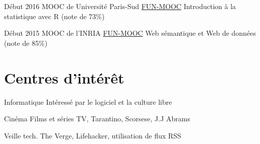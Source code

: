 \documentclass[letterpaper]{twentysecondcv} %
\begin{document}
\begin{twenty}
    
    \twentyitem
    	{Début 2016}
        {MOOC de Université Paris-Sud}
        {\href{http://www.fun-mooc.fr/courses/UPSUD/42001S06/session06/about}{FUN-MOOC}}
        {}
        {
        {Introduction à la statistique avec R (note de 73\%)}
        }
        
    \twentyitem
    	{Début 2015}
        {MOOC de l’INRIA}
        {\href{https://www.fun-mooc.fr}{FUN-MOOC}}
        {}
        {
        {Web sémantique et Web de données (note de 85\%)}
        }

\end{twenty}

\section{Centres d'intérêt}

\begin{twenty}    
    \twentyitem
    	{Informatique}
    	{}
    	{}
        {Intéressé par le logiciel et la culture libre}
        {}
	
	  \twentyitem
    	{Cinéma}
    	{}
    	{}
        {Films et séries TV, Tarantino, Scorsese, J.J Abrams}
        {}
        
     \twentyitem
    	{Veille tech.}
    	{}
    	{}
        {The Verge, Lifehacker, utilisation de flux RSS}
        {}


        
       
        

\end{twenty}
\end{document}
